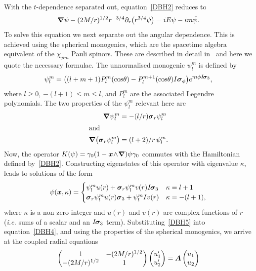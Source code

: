 \documentclass[a4paper]{article}
\numberwithin{equation}{section}
\newcommand{\et}[1]{e^{\mbox{\footnotesize $#1$}}}
\newcommand{\wdg}{\! \wedge \!}
\newcommand{\kap}{\kappa}
\newcommand{\sig}{\mbox{\boldmath $\sigma$}}
\newcommand{\bx}{\mbox{\boldmath $x$}}
\newcommand{\bA}{\mbox{\boldmath $A$}}
\newcommand{\bsig}{\mbox{\boldmath $\sig$}}
\newcommand{\dr}{\partial_r}
\newcommand{\sk}{\bsig_3}
\newcommand{\isk}{I \hspace{-1pt} \bsig_3}
\newcommand{\go}{\gamma_{0}}
\newcommand{\sigr}{\bsig_r}
\newcommand{\psibar}{\bar{\psi}}
\newcommand{\grad}{\nabla}
\newcommand{\bgrad}{\mbox{\boldmath $\grad$}}
\begin{document}
With the $t$-dependence separated out, equation~\eqref{DBH2} reduces to
%
\begin{equation}
\bgrad \psi -  (2M/r)^{1/2} r^{-3/4} \dr \bigl(r^{3/4} \psi \bigr) = i
E \psi - i m \psibar. 
\label{DBH4}
\end{equation}
%
To solve this equation we next separate out the angular dependence.
This is achieved using the spherical monogenics, which are the
spacetime algebra equivalent of the $\chi_{jlm}$ Pauli spinors.  These
are described in detail in~\cite{DGL95-elphys} and here we quote the
necessary formulae.  The unnormalised monogenic $\psi^m_l$ is defined
by
%
\begin{equation}
\psi_l^m = \bigl((l+m+1)P_l^m(\cos\!\theta) -
P_l^{m+1}(\cos\!\theta) I\sig_\phi \bigr) \et{m\phi\isk},
\end{equation} 
%
where $l\geq 0$, $-(l+1) \leq m \leq l$, and $P^m_l$ are the associated
Legendre polynomials.  The two properties of the $\psi^m_l$ relevant
here are
%
\begin{align}
\bgrad \psi^m_l &= - (l/r) \sig_r \psi_l^m \\
%
\intertext{and}
%
\bgrad \bigl(\sigr \psi^m_l \bigr) &= (l+2)/r \, \psi_l^m .
\end{align}
%
Now, the operator $K(\psi) = \go (1-\bx \wdg \bgrad ) \psi \go$
commutes with the Hamiltonian defined by~\eqref{DBH2}.  Constructing
eigenstates of this operator with eigenvalue $\kap$, leads to
solutions of the form 
%
\begin{equation}
\psi(\bx, \kap) = 
\begin{cases}
\psi^m_l u(r) + \sigr \psi^m_l v(r) \isk & \kap = l+1 \\
\sigr \psi^m_l u(r) \sk + \psi^m_l Iv(r) & \kap = -(l+1) ,
\end{cases}
\label{DBH5}
\end{equation}
%
where $\kap$ is a non-zero integer and $u(r)$ and $v(r)$ are complex
functions of $r$ (\textit{i.e.}  sums of a scalar and an $\isk$ term).
Substituting~\eqref{DBH5} into equation~\eqref{DBH4}, and using the properties
of the spherical monogenics, we arrive at the coupled radial
equations
%
\begin{equation}
\begin{pmatrix} 1 & - (2M/r)^{1/2}  \\ - (2M/r)^{1/2} & 1 
\end{pmatrix}
\begin{pmatrix} u_1' \\ u_2' \end{pmatrix} 
= \bA \begin{pmatrix} u_1 \\ u_2 \end{pmatrix}
\label{DBH7}
\end{equation}
\end{document}
